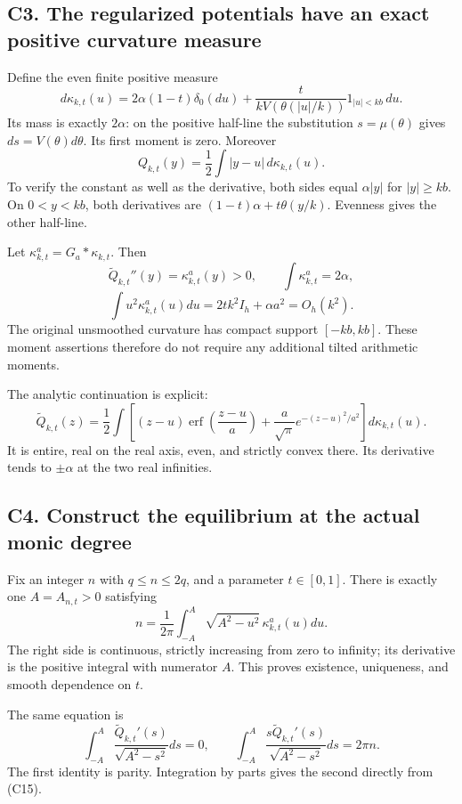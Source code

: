 \documentclass[
  11pt,
]{article}
\begin{document}
\subsection{C3. The regularized potentials have an exact positive
curvature
measure}\label{c3.-the-regularized-potentials-have-an-exact-positive-curvature-measure}

Define the even finite positive measure \[
d\kappa_{k,t}(u)=2\alpha(1-t)\delta_0(du)
+\frac{t}{kV(\theta(|u|/k))}1_{|u|<kb}\,du.
\tag{C11}
\] Its mass is exactly \(2\alpha\): on the positive half-line the
substitution \(s=\mu(\theta)\) gives \(ds=V(\theta)d\theta\). Its first
moment is zero. Moreover \[
\boxed{Q_{k,t}(y)=\frac12\int|y-u|\,d\kappa_{k,t}(u).}\tag{C12}
\] To verify the constant as well as the derivative, both sides equal
\(\alpha|y|\) for \(|y|\ge kb\). On \(0<y<kb\), both derivatives are
\((1-t)\alpha+t\theta(y/k)\). Evenness gives the other half-line.

Let \(\kappa^a_{k,t}=G_a*\kappa_{k,t}\). Then \[
\widetilde Q_{k,t}''(y)=\kappa^a_{k,t}(y)>0,
\qquad \int\kappa^a_{k,t}=2\alpha,
\] \[
\int u^2\kappa^a_{k,t}(u)du=2tk^2I_h+\alpha a^2=O_h(k^2).
\tag{C13}
\] The original unsmoothed curvature has compact support \([-kb,kb]\).
These moment assertions therefore do not require any additional tilted
arithmetic moments.

The analytic continuation is explicit: \[
\widetilde Q_{k,t}(z)=\frac12\int
\left[(z-u)\operatorname{erf}\!\left(\frac{z-u}{a}\right)
+\frac a{\sqrt\pi}e^{-(z-u)^2/a^2}\right]d\kappa_{k,t}(u).
\tag{C14}
\] It is entire, real on the real axis, even, and strictly convex there.
Its derivative tends to \(\pm\alpha\) at the two real infinities.

\subsection{C4. Construct the equilibrium at the actual monic
degree}\label{c4.-construct-the-equilibrium-at-the-actual-monic-degree}

Fix an integer \(n\) with \(q\le n\le2q\), and a parameter
\(t\in[0,1]\). There is exactly one \(A=A_{n,t}>0\) satisfying \[
\boxed{n=\frac1{2\pi}\int_{-A}^{A}
\sqrt{A^2-u^2}\,\kappa^a_{k,t}(u)du.}\tag{C15}
\] The right side is continuous, strictly increasing from zero to
infinity; its derivative is the positive integral with numerator \(A\).
This proves existence, uniqueness, and smooth dependence on \(t\).

The same equation is \[
\int_{-A}^A\frac{\widetilde Q_{k,t}'(s)}{\sqrt{A^2-s^2}}ds=0,
\qquad
\int_{-A}^A\frac{s\widetilde Q_{k,t}'(s)}{\sqrt{A^2-s^2}}ds=2\pi n.
\tag{C16}
\] The first identity is parity. Integration by parts gives the second
directly from (C15).
\end{document}
